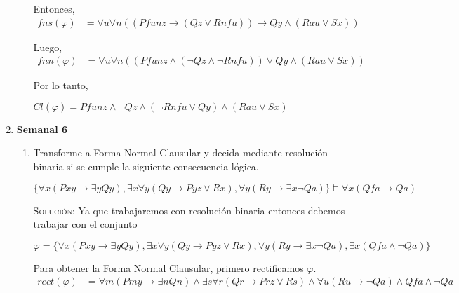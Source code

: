 \documentclass[letterpaper,12pt]{article}
\begin{document}
\begin{enumerate}
\begin{enumerate}
        Entonces,
        \begin{align*}
            fns(\varphi) &=
            \forall u \forall n ((Pfunz \rightarrow 
            (Qz \lor Rnfu)) \rightarrow Qy \land (Rau \lor Sx)) 
        \end{align*}
        
        Luego, 
        \begin{align*}
            fnn(\varphi) &=
            \forall u \forall n ((Pfunz \land (\neg Qz \land \neg Rnfu)) 
            \lor Qy \land (Rau \lor Sx)) 
        \end{align*}

        Por lo tanto, 
        \begin{center}
            $Cl(\varphi) =
            Pfunz \land \neg Qz \land (\neg Rnfu \lor Qy) \land (Rau \lor Sx)$
        \end{center}    

    \end{enumerate}

    \item \textbf{Semanal 6}
    \begin{enumerate}
        \item Transforme a Forma Normal Clausular y decida mediante resolución
        binaria si se cumple la siguiente consecuencia lógica.

        \begin{center}
            $\{\forall x (Pxy \rightarrow \exists y Qy), 
            \exists x \forall y (Qy \rightarrow Pyz \lor Rx),
            \forall y (Ry \rightarrow \exists x \neg Qa) \} 
            \models \forall x (Qfa \rightarrow Qa)$
        \end{center}

        \textsc{Solución:} Ya que trabajaremos con resolución binaria entonces 
        debemos trabajar con el conjunto

        \begin{center}
            $\varphi = \{\forall x (Pxy \rightarrow \exists y Qy), 
            \exists x \forall y (Qy \rightarrow Pyz \lor Rx),
            \forall y (Ry \rightarrow \exists x \neg Qa),
            \exists x (Qfa \land \neg Qa)\}$
        \end{center}

        Para obtener la Forma Normal Clausular, primero
        rectificamos $\varphi$.
        \begin{align*}
            rect(\varphi) &= 
            \forall m (Pmy \rightarrow \exists n Qn) \land 
            \exists s \forall r (Qr \rightarrow Prz \lor Rs) \land 
            \forall u (Ru \rightarrow \neg Qa) \land Qfa \land \neg Qa
        \end{align*}


\end{enumerate}
\end{enumerate}
\end{document}

